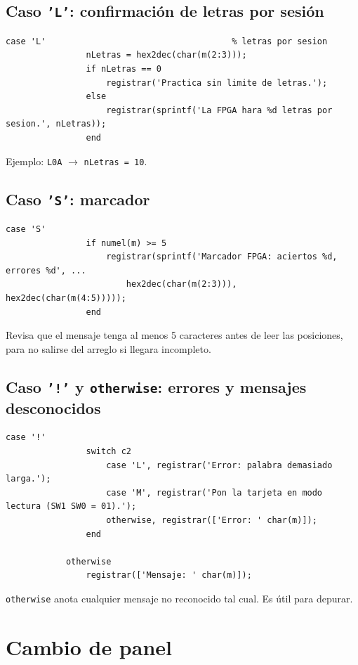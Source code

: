 \documentclass[11pt,a4paper]{article}
\newcommand{\cod}[1]{\texttt{#1}}
\begin{document}
\subsection{Caso \texttt{'L'}: confirmación de letras por sesión}
\begin{lstlisting}[firstnumber=262]
            case 'L'                                     % letras por sesion
                nLetras = hex2dec(char(m(2:3)));
                if nLetras == 0
                    registrar('Practica sin limite de letras.');
                else
                    registrar(sprintf('La FPGA hara %d letras por sesion.', nLetras));
                end
\end{lstlisting}
Ejemplo: \cod{L0A} $\rightarrow$ \cod{nLetras = 10}.

\subsection{Caso \texttt{'S'}: marcador}
\begin{lstlisting}[firstnumber=270]
            case 'S'
                if numel(m) >= 5
                    registrar(sprintf('Marcador FPGA: aciertos %d, errores %d', ...
                        hex2dec(char(m(2:3))), hex2dec(char(m(4:5)))));
                end
\end{lstlisting}
Revisa que el mensaje tenga al menos 5 caracteres antes de leer las posiciones,
para no salirse del arreglo si llegara incompleto.

\subsection{Caso \texttt{'!'} y \texttt{otherwise}: errores y mensajes desconocidos}
\begin{lstlisting}[firstnumber=276]
            case '!'
                switch c2
                    case 'L', registrar('Error: palabra demasiado larga.');
                    case 'M', registrar('Pon la tarjeta en modo lectura (SW1 SW0 = 01).');
                    otherwise, registrar(['Error: ' char(m)]);
                end

            otherwise
                registrar(['Mensaje: ' char(m)]);
\end{lstlisting}
\cod{otherwise} anota cualquier mensaje no reconocido tal cual. Es útil para depurar.

\section{Cambio de panel}
\end{document}

